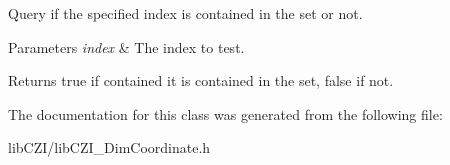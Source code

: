 Query if the specified \textquotesingle{}index\textquotesingle{} is contained in the set or not.


\begin{DoxyParams}{Parameters}
{\em index} & The index to test.\\
\hline
\end{DoxyParams}
\begin{DoxyReturn}{Returns}
true if contained it is contained in the set, false if not. 
\end{DoxyReturn}


The documentation for this class was generated from the following file\+:\begin{DoxyCompactItemize}
\item 
lib\+C\+Z\+I/lib\+C\+Z\+I\+\_\+\+Dim\+Coordinate.\+h\end{DoxyCompactItemize}
